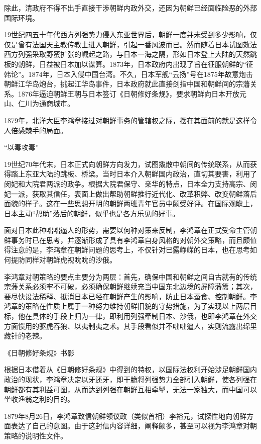 \documentclass[12pt,UTF8]{ctexbook}
\begin{document}
除此，清政府不得不出手直接干涉朝鲜内政外交，还因为朝鲜已经面临险恶的外部国际环境。

19世纪四五十年代西方列强势力侵入东亚世界后，朝鲜一度并未受到多少影响，仅仅是曾有法国天主教传教士进入朝鲜，引起一番风波而已。然而随着日本试图效法西方列强采取野蛮扩张的崛起之路，与日本一海之隔，形如日本登上大陆的天然跳板的朝鲜，日益被日本加以谋算。1873年，日本政府内出现了旨在征服朝鲜的“征韩论”。1874年，日本入侵中国台湾。不久，日本军舰“云扬”号在1875年故意炮击朝鲜江华岛炮台，挑起江华岛事件，日本政府就此直接剑指中国和朝鲜间的宗藩关系。1876年逼迫朝鲜王朝与日本签订《日朝修好条规》，要求朝鲜向日本开放元山、仁川为通商城市。

1879年，北洋大臣李鸿章接过对朝鲜事务的管辖权之际，摆在其面前的就是这样令人倍感棘手的局面。

“以毒攻毒”

19世纪70年代末，日本正式向朝鲜方向发力，试图撬散中朝间的传统联系，从而获得踏上东亚大陆的跳板、桥梁。当时日本介入朝鲜国内政治，直切其要害，利用了闵妃和大院君两派的政争。根据大院君保守、亲华的特点，日本全力支持高宗、闵妃一派，获取其信任，表面上做出帮助朝鲜推行近代化、改革积弊、改变朝鲜落后面貌的样子。这在一些思想开明的朝鲜两班青年官员中颇受好评。在国际观瞻上，日本主动“帮助”落后的朝鲜，似乎也是各方乐见的好事。

面对日本此种咄咄逼人的形势，需要以何种对策来反制，李鸿章在正式受命主管朝鲜事务时已在思考，并逐渐形成了具有李鸿章自身风格的对朝外交策略，而且颇值得注意的是，李鸿章在朝鲜问题的思考上，不仅针对已露峥嵘的日本，也在思考如何提防同样对朝鲜虎视眈眈的沙俄。

李鸿章对朝策略的要点主要分为两层：首先，确保中国和朝鲜之间自古就有的传统宗藩关系必须牢不可破，必须确保朝鲜继续充当中国东北边境的屏障藩篱；其次，要尽快设法稀释、抵消日本已经在朝鲜产生的影响，防止日本蚕食、控制朝鲜。李鸿章的策略在性质上属于一种努力维持朝鲜旧貌的守势措施，为了实现以上两层目标，他在具体的手段上归为一律，即利用列强牵制日本、沙俄，也即李鸿章在外交方面惯用的驱虎吞狼、以夷制夷之术。其手段看似并不咄咄逼人，实则流露出绵里藏针的老辣。


《日朝修好条规》书影

根据日本借着从《日朝修好条规》中得到的特权，以国际法权利开始涉足朝鲜国内政治的现状，李鸿章决定以牙还牙，即干脆将列强势力全部引入朝鲜，使各列强在朝鲜都有其利益可图，从而达到列强在朝鲜互相牵掣，无法一家独大，而中国可以坐收渔翁之利的目的。

1879年8月26日，李鸿章致信朝鲜领议政（类似首相）李裕元，试探性地向朝鲜方面表达了自己的意图。由于这封信内容详细，阐释颇多，甚至可以视为李鸿章对朝策略的说明性文件。
\end{document}
